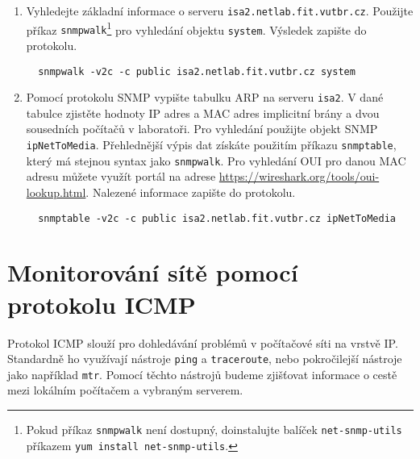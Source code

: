 \documentclass[a4paper,11pt]{article}
\begin{document}
\begin{enumerate}
\item Vyhledejte základní informace o serveru {\tt isa2.netlab.fit.vutbr.cz}.  Použijte příkaz {\tt snmpwalk}\footnote{Pokud příkaz {\tt snmpwalk} není dostupný, doinstalujte balíček \texttt{net-snmp-utils} příkazem \texttt{yum install net-snmp-utils}.} pro vyhledání objektu \texttt{system}. %
  Výsledek zapište do protokolu. 
\begin{verbatim}
  snmpwalk -v2c -c public isa2.netlab.fit.vutbr.cz system
\end{verbatim}
\item Pomocí protokolu SNMP vypište tabulku ARP na serveru {\tt isa2}. V dané tabulce zjistěte hodnoty IP adres a MAC adres implicitní brány a dvou sousedních počítačů v laboratoři. Pro vyhledání použijte objekt SNMP \texttt{ipNetToMedia}. Přehlednější výpis dat získáte použitím příkazu \texttt{snmptable}, který má stejnou syntax jako \texttt{snmpwalk}. Pro vyhledání OUI pro danou MAC adresu můžete využít portál na adrese \url{https://wireshark.org/tools/oui-lookup.html}. Nalezené informace zapište do protokolu. 
\begin{verbatim}
  snmptable -v2c -c public isa2.netlab.fit.vutbr.cz ipNetToMedia
\end{verbatim}
\end{enumerate}

\section{Monitorování sítě pomocí protokolu ICMP}
Protokol ICMP slouží pro dohledávání problémů v počítačové síti na vrstvě IP. Standardně ho využívají nástroje \texttt{ping} a \texttt{traceroute}, nebo pokročilejší nástroje jako například \texttt{mtr}. Pomocí těchto nástrojů budeme zjišťovat informace o cestě mezi lokálním počítačem a vybraným serverem.
\end{document}
